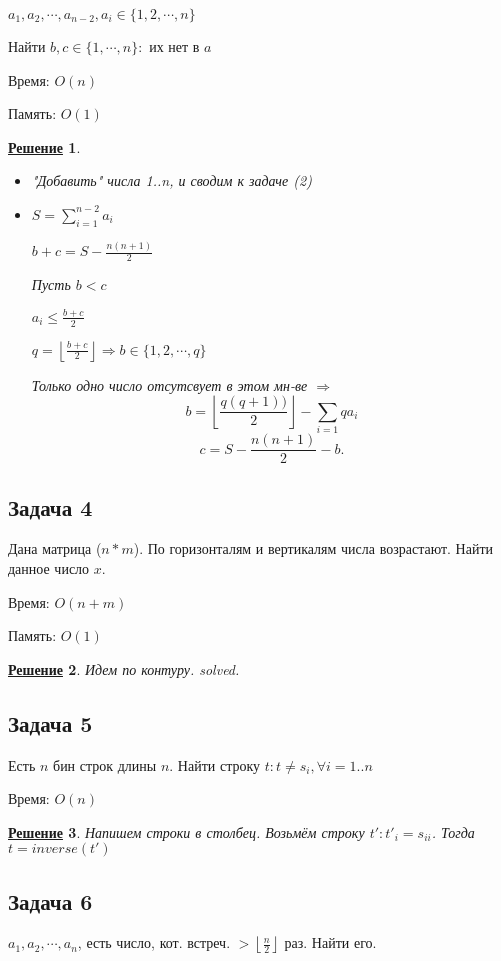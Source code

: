 \documentclass[a4, 12pt]{article}
\newcommand{\floor}[1]{\left\lfloor #1 \right\rfloor}
\newtheorem*{solution}{\underline{Решение}}
\theoremstyle{definition}
\begin{document}
$a_1, a_2, \cdots, a_{n - 2}, a_i \in \{1, 2, \cdots, n\}$ 

Найти $b, c \in \{1, \cdots, n\} \colon $ их нет в ${a}$

Время: $O(n)$ 

Память: $O(1)$
\begin{solution}
\begin{itemize}
    \item[I) ] "Добавить" числа 1..n, и сводим к задаче (2)
    \item[II) ] $S = \sum_{i = 1}^{n - 2} a_i$ 

          $ b + c = S - \frac{n(n+1)}{2}$

          Пусть $b < c $

          $a_i \leq \frac{b+c}{2}$

          $q = \floor{\frac{b+c}{2}} \Rightarrow b \in \{1, 2, \cdots, q\}$

          Только одно число отсутсвует в этом мн-ве $\Rightarrow$
          \[
              b = \floor{\frac{q(q+1))}{2}} - \sum_{i = 1}{q} a_i
          \]
          \[
              c = S - \frac{n(n+1)}{2} - b
          .\] 
\end{itemize}
\end{solution}

\subsection{Задача 4}
Дана матрица ($n * m$). По горизонталям и вертикалям числа возрастают. Найти данное число $x$.

Время: $O(n + m)$ 

Память: $O(1)$

\begin{solution}
Идем по контуру. solved.
\end{solution}

\subsection{Задача 5}
Есть $n$ бин строк длины $n$. Найти строку $t \colon t \neq s_i, \forall i=1..n$

Время: $O(n)$

\begin{solution}
Напишем строки в столбец. Возьмём строку $t '\colon  t'_i = s_{ii}$. Тогда $t = inverse(t')$
\end{solution}

\subsection{Задача 6}
$a_1, a_2, \cdots, a_n$, есть число, кот. встреч. $ > \floor{\frac{n}{2}}$ раз. Найти его.
\end{document}
